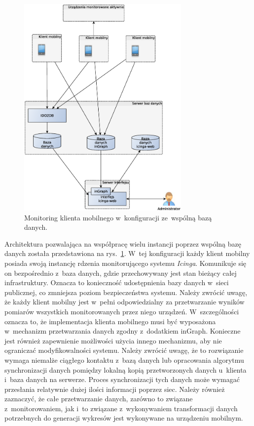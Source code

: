 \begin{figure}[ht]
  \centering
  \caption{Monitoring klienta mobilnego w~konfiguracji ze~wspólną bazą
    danych.}
  \label{fig:mobilnyWspBaza}
\includegraphics[width=0.75\textwidth]{img/mobilnyWspBaza}
\end{figure}

Architektura pozwalająca na współpracę wielu instancji poprzez wspólną
bazę danych została przedstawiona na
rys.~\ref{fig:mobilnyWspBaza}. W~tej konfiguracji każdy klient mobilny
posiada swoją instancję rdzenia monitorującego systemu
{\em Icinga}. Komunikuje się on bezpośrednio z~baza danych, gdzie
przechowywany jest stan bieżący całej infrastruktury. Oznacza to
konieczność udostępnienia bazy danych w~sieci publicznej, co zmniejsza
poziom bezpieczeństwa systemu. Należy zwrócić uwagę, że każdy klient
mobilny jest w~pełni odpowiedzialny za przetwarzanie wyników pomiarów
wszystkich monitorowanych przez niego urządzeń. W~szczególności
oznacza to, że implementacja klienta mobilnego musi być wyposażona
w~mechanizm przetwarzania danych zgodny z~dodatkiem inGraph. Konieczne
jest również zapewnienie możliwości użycia innego mechanizmu, aby nie
ograniczać modyfikowalności systemu. Należy zwrócić uwagę, że to
rozwiązanie wymaga niemalże ciągłego kontaktu z~bazą danych lub
opracowania algorytmu synchronizacji danych pomiędzy lokalną kopią
przetworzonych danych u~klienta i~baza danych na serwerze. Proces
synchronizacji tych danych może wymagać przesłania relatywnie dużej
ilości informacji poprzez siec. Należy również zaznaczyć, że całe
przetwarzanie danych, zarówno to związane z~monitorowaniem, jak i~to
związane z~wykonywaniem transformacji danych potrzebnych do generacji
wykresów jest wykonywane na urządzeniu mobilnym.

